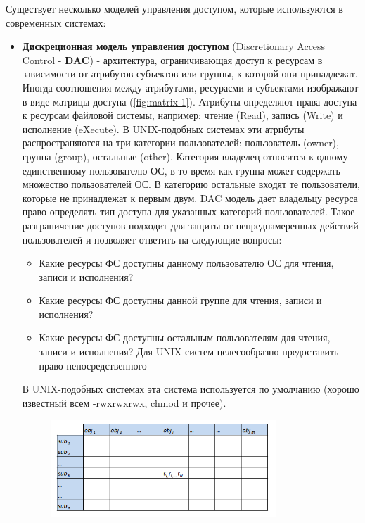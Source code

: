 Существует несколько моделей управления доступом, которые используются в современных системах:
\begin{itemize}
    \item \textbf{Дискреционная модель управления доступом} (Discretionary Access Control - \textbf{DAC}) -
        архитектура, ограничивающая доступ к  ресурсам в зависимости от атрибутов субъектов или
        группы, к которой они принадлежат. Иногда соотношения между атрибутами, ресурасми и субъектами изображают в виде матрицы доступа (\ref{fig:matrix-1}). Атрибуты определяют права доступа к ресурсам
        файловой системы, например: чтение (Read), запись (Write) и исполнение (eXecute).
        В UNIX-подобных системах эти атрибуты распространяются на три категории пользователей:
        пользователь (owner), группа (group), остальные (other). Категория владелец относится
        к одному единственному пользователю ОС, в то время как группа может содержать множество
        пользователей ОС. В категорию остальные входят те пользователи, которые не принадлежат
        к первым двум.
        DAC модель дает владельцу ресурса право определять тип доступа для указанных категорий
        пользователей. Такое разграничение доступов подходит для защиты от непреднамеренных
        действий пользователей и позволяет ответить на следующие вопросы:
        \begin{itemize}
            \item Какие ресурсы ФС доступны данному пользователю ОС для чтения, записи и исполнения?
            \item Какие ресурсы ФС доступны данной группе для чтения, записи и исполнения?
            \item Какие ресурсы ФС доступны остальным пользователям для чтения, записи и исполнения?
                Для UNIX-систем целесообразно предоставить право непосредственного
        \end{itemize}
        В UNIX-подобных системах эта система используется по умолчанию (хорошо известный всем
        -rwxrwxrwx, chmod и прочее).
        \begin{figure}[h]
    \centering
    \includegraphics[width=0.8\textwidth]{assets/Матрица_доступа.png}

\end{figure}
\end{itemize}
